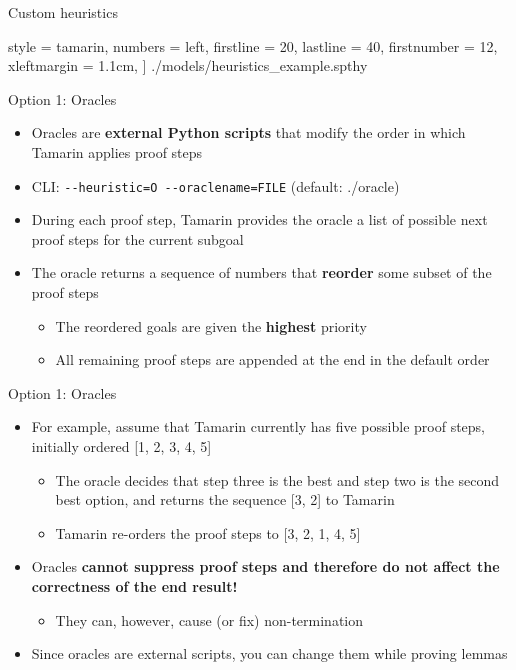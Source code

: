 \documentclass[11pt,aspectratio=169]{beamer}
\begin{document}
\begin{frame}[fragile]{Custom heuristics}
    \vspace*{.5cm}
    
        style = tamarin,
        numbers = left,
        firstline = 20,
        lastline = 40,
        firstnumber = 12,
        xleftmargin = 1.1cm,
    ] {./models/heuristics_example.spthy}
\end{frame}

\begin{frame}[fragile]{Option 1: Oracles}
    \begin{itemize}
        \item Oracles are \textbf{external Python scripts} that modify the
              order in which Tamarin applies proof steps
        \item CLI: \verb|--heuristic=O --oraclename=FILE| (default: ./oracle)
        \item During each proof step, Tamarin provides the oracle a list of 
              possible next proof steps for the current subgoal
        \item The oracle returns a sequence of numbers that \textbf{reorder} 
              some subset of the proof steps
        \begin{itemize}
            \item The reordered goals are given the \textbf{highest} priority
            \item All remaining proof steps are appended at the end in the 
                  default order
        \end{itemize}
    \end{itemize}
\end{frame}

\begin{frame}[fragile]{Option 1: Oracles}
    \begin{itemize}
        \item For example, assume that Tamarin currently has five possible 
              proof steps, initially ordered [1, 2, 3, 4, 5]
        \begin{itemize}
            \item The oracle decides that step three is the best and step two 
                  is the second best option, and returns the sequence [3, 2] to 
                  Tamarin
            \item Tamarin re-orders the proof steps to [3, 2, 1, 4, 5]
        \end{itemize}
        \item Oracles \textbf{cannot suppress proof steps and therefore do not 
              affect the correctness of the end result!}
        \begin{itemize}
            \item They can, however, cause (or fix) non-termination
        \end{itemize}
        \item Since oracles are external scripts, you can change them while 
              proving lemmas
    \end{itemize}
\end{frame}
\end{document}
